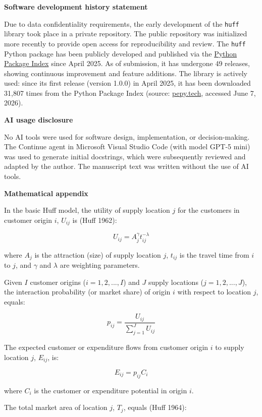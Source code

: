 \documentclass[
]{article}
\begin{document}
\textbf{Software development history statement}

Due to data confidentiality requirements, the early development of the
\texttt{huff} library took place in a private repository. The public
repository was initialized more recently to provide open access for
reproducibility and review. The \texttt{huff} Python package has been
publicly developed and published via the
\href{https://pypi.org/project/huff/}{Python Package Index} since April
2025. As of submission, it has undergone 49 releases, showing continuous
improvement and feature additions. The library is actively used: since
its first release (version 1.0.0) in April 2025, it has been downloaded
31,807 times from the Python Package Index (source:
\href{https://pepy.tech/project/huff}{pepy.tech}, accessed June 7,
2026).

\textbf{AI usage disclosure}

No AI tools were used for software design, implementation, or
decision-making. The Continue agent in Microsoft Visual Studio Code
(with model GPT-5 mini) was used to generate initial docstrings, which
were subsequently reviewed and adapted by the author. The manuscript
text was written without the use of AI tools.

\textbf{Mathematical appendix}

In the basic Huff model, the utility of supply location \(j\) for the
customers in customer origin \(i\), \(U_{ij}\) is (Huff 1962):

\[U_{ij} = A_j^{\gamma} t_{ij}^{-\lambda}\]

where \(A_j\) is the attraction (size) of supply location \(j\),
\(t_{ij}\) is the travel time from \(i\) to \(j\), and \(\gamma\) and
\(\lambda\) are weighting parameters.

Given \(I\) customer origins (\(i = 1,2,...,I\)) and \(J\) supply
locations (\(j = 1,2,...,J\)), the interaction probability (or market
share) of origin \(i\) with respect to location \(j\), equals:

\[p_{ij} = \frac{U_{ij}}{\sum_{j=1}^J U_{ij}}\]

The expected customer or expenditure flows from customer origin \(i\) to
supply location \(j\), \(E_{ij}\), is:

\[E_{ij} = p_{ij} C_i\]

where \(C_i\) is the customer or expenditure potential in origin \(i\).

The total market area of location \(j\), \(T_j\), equals (Huff 1964):
\end{document}

